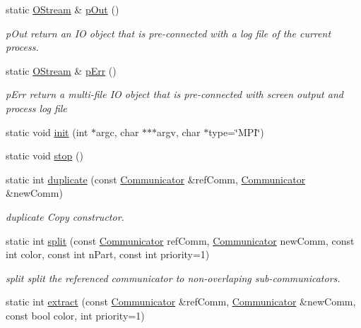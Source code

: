 \begin{DoxyCompactItemize}
static \hyperlink{classHSF_1_1OStream}{OStream} \& \hyperlink{classHSF_1_1COMM_a34972039314a2f48f084316f6c2a02bb}{pOut} ()
\begin{DoxyCompactList}\small\item\em pOut return an IO object that is pre-\/connected with a log file of the current process. \item\end{DoxyCompactList}\item 
static \hyperlink{classHSF_1_1OStream}{OStream} \& \hyperlink{classHSF_1_1COMM_ad3b168a9b2f1a465334f5c161d8fb67b}{pErr} ()
\begin{DoxyCompactList}\small\item\em pErr return a multi-\/file IO object that is pre-\/connected with screen output and process log file \item\end{DoxyCompactList}\item 
static void \hyperlink{classHSF_1_1COMM_a4e1c8c801a57bb3f57e78e89ecbe98a4}{init} (int $\ast$argc, char $\ast$$\ast$$\ast$argv, char $\ast$type=\char`\"{}MPI\char`\"{})
\item 
static void \hyperlink{classHSF_1_1COMM_a4e6c81ad1d5471ea0b9cf1ff00afb041}{stop} ()
\item 
static int \hyperlink{classHSF_1_1COMM_a093162ff2492f8f27d86cb998ff52f10}{duplicate} (const \hyperlink{classHSF_1_1Communicator}{Communicator} \&refComm, \hyperlink{classHSF_1_1Communicator}{Communicator} \&newComm)
\begin{DoxyCompactList}\small\item\em duplicate Copy constructor. \item\end{DoxyCompactList}\item 
static int \hyperlink{classHSF_1_1COMM_a1e80b3cf7e5fdf42c7e4461adfa116bc}{split} (const \hyperlink{classHSF_1_1Communicator}{Communicator} refComm, \hyperlink{classHSF_1_1Communicator}{Communicator} newComm, const int color, const int nPart, const int priority=1)
\begin{DoxyCompactList}\small\item\em split split the referenced communicator to non-\/overlaping sub-\/communicators. \item\end{DoxyCompactList}\item 
static int \hyperlink{classHSF_1_1COMM_a098fb0d3618c3ff9cd18f25eed6c8c25}{extract} (const \hyperlink{classHSF_1_1Communicator}{Communicator} \&refComm, \hyperlink{classHSF_1_1Communicator}{Communicator} \&newComm, const bool color, int priority=1)

\end{DoxyCompactItemize}
